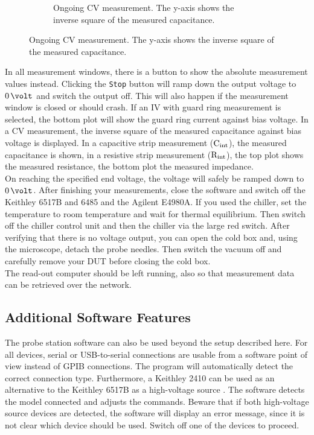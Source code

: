 \documentclass[a4paper]{article}
\begin{document}
\begin{figure}[hbtp]
\begin{subfigure}[t]{0.475\textwidth}
\caption[Running CV Measurement]{Ongoing CV measurement. The y-axis shows the inverse square of the measured capacitance.}
\label{fig:cvmeas}
\end{subfigure}
\end{figure}

In all measurement windows, there is a button to show the absolute measurement values instead.
Clicking the {\tt Stop} button will ramp down the output voltage to $0\,\volt$ and switch the output off.
This will also happen if the measurement window is closed or should crash.
If an IV with guard ring measurement is selected, the bottom plot will show the guard ring current against bias voltage.
In a CV measurement, the inverse square of the measured capacitance against bias voltage is displayed.
In a capacitive strip measurement (${\rm C_{int}}$), the measured capacitance is shown, in a resistive strip measurement (${\rm R_{int}}$), the top plot shows the measured resistance, the bottom plot the measured impedance.\\

On reaching the specified end voltage, the voltage will safely be ramped down to $0\,\volt$.
After finishing your measurements, close the software and switch off the Keithley 6517B and 6485 and the Agilent E4980A.
If you used the chiller, set the temperature to room temperature and wait for thermal equilibrium.
Then switch off the chiller control unit and then the chiller via the large red switch.
After verifying that there is no voltage output, you can open the cold box and, using the microscope, detach the probe needles.
Then switch the vacuum off and carefully remove your DUT before closing the cold box.\\

The read-out computer should be left running, also so that measurement data can be retrieved over the network.\\

\subsection{Additional Software Features}
\label{sec:additional}

The probe station software can also be used beyond the setup described here.
For all devices, serial or USB-to-serial connections are usable from a software point of view instead of GPIB connections.
The program will automatically detect the correct connection type.
Furthermore, a Keithley 2410 can be used as an alternative to the Keithley 6517B as a high-voltage source .
The software detects the model connected and adjusts the commands.
Beware that if both high-voltage source devices are detected, the software will display an error message, since it is not clear which device should be used.
Switch off one of the devices to proceed.\\
\end{document}
